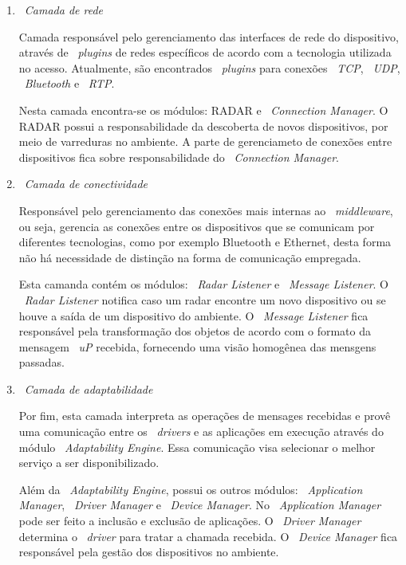 	\begin{enumerate}
	  \item ~\emph{Camada de rede}

		Camada responsável pelo gerenciamento das interfaces de rede do dispositivo, através de
		~\textit{plugins} de redes específicos de acordo com a tecnologia utilizada no acesso. Atualmente,
		são encontrados ~\textit{plugins} para conexões ~\textit{TCP}, ~\textit{UDP},
		~\textit{Bluetooth} e ~\textit{RTP}.
		
		Nesta camada encontra-se os módulos: RADAR e ~\textit{Connection Manager}. O RADAR possui a
		responsabilidade da descoberta de novos dispositivos, por meio de varreduras no ambiente.
		A parte de gerenciameto de conexões entre dispositivos fica sobre responsabilidade do
		~\textit{Connection Manager}.
	  	
	  \item ~\emph{Camada de conectividade}
	  
	 	Responsável pelo gerenciamento das conexões mais internas ao ~\textit{middleware}, ou seja,
	 	gerencia as conexões entre os dispositivos que se comunicam por diferentes tecnologias, como por
	 	exemplo Bluetooth e Ethernet, desta forma não há necessidade de distinção na forma de comunicação
	 	empregada.
	 	
	 	Esta camanda contém os módulos: ~\textit{Radar Listener} e ~\textit{Message Listener}. O
	 	~\textit{Radar Listener} notifica caso um radar encontre um novo dispositivo ou se houve a
	 	saída de um dispositivo do ambiente. O ~\textit{Message Listener} fica responsável pela
	 	transformação dos objetos de acordo com o formato da mensagem ~\textit{uP} recebida, fornecendo
	 	uma visão homogênea das mensgens passadas.
	  
	  \item ~\emph{Camada de adaptabilidade}
	  
		Por fim, esta camada interpreta as operações de mensages recebidas e provê uma comunicação entre
		os ~\textit{drivers} e as aplicações em execução através do módulo ~\textit{Adaptability Engine}.
		Essa comunicação visa selecionar o melhor serviço a ser disponibilizado. 
		
		Além da ~\textit{Adaptability Engine}, possui os outros módulos: ~\textit{Application Manager},
		~\textit{Driver Manager} e ~\textit{Device Manager}. No ~\textit{Application Manager} pode ser
		feito a inclusão e exclusão de aplicações. O ~\textit{Driver Manager} determina o ~\textit{driver}
		para tratar a chamada recebida. O ~\textit{Device Manager} fica responsável pela gestão dos
		dispositivos no ambiente.
		  
	\end{enumerate}